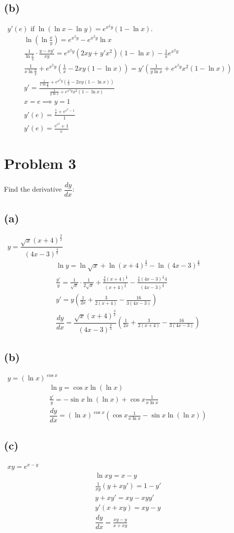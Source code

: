 \documentclass[12pt]{article}
\newcommand{\dydx}{\dfrac{dy}{dx}}
\newcommand{\vem}{\vspace{0.5em}}
\newcommand{\problem}[1]{\section{Problem #1}}
\newcommand{\subproblem}[1]{\subsection{(#1)} \,}
\begin{document}
\subproblem{b} $y'(e)$ if $\ln (\ln x-\ln y)=e^{x^2y}(1-\ln x)$.
\begin{gather*}
    \ln (\ln\frac{x}{y})=e^{x^2y}-e^{x^2y} \ln x\\
    \frac{1}{\ln \frac{x}{y}}\cdot \frac{y-xy'}{xy}=e^{x^2y}(2xy+y'x^2)(1-\ln x)-\frac{1}{x}e^{x^2y}\\
    \frac{1}{x \ln \frac{x}{y}}+e^{x^2y}(\frac{1}{x}-2xy(1-\ln x))=y'(\frac{1}{y \ln x}+e^{x^2y}x^2(1- \ln x))\\
    y'=\frac{\frac{1}{x \ln \frac{x}{y}}+e^{x^2y}(\frac{1}{x}-2xy(1-\ln x))}{\frac{1}{y \ln x}+e^{x^2y}x^2(1- \ln x)}\\
    x=e \implies y=1\\
    y'(e)=\frac{\frac{1}{e}+e^{e^2-1}}{1}\\
    \boxed{y'(e)=\frac{e^{e^2}+1}{e}}
\end{gather*}

\problem{3}
Find the derivative $\dydx$: \vem

\subproblem{a} $y=\dfrac{\sqrt{x}(x+4)^\frac{3}{2}}{(4x-3)^\frac{4}{3}}$
\begin{gather*}
    \ln y = \ln \sqrt{x} +\ln (x+4)^\frac{3}{2}-\ln (4x-3)^{\frac{4}{3}}\\
    \frac{y'}{y}= \frac{1}{\sqrt{x}}\cdot\frac{1}{2\sqrt{x}}+\frac{\frac{3}{2}(x+4)^\frac{1}{2}}{(x+4)^\frac{3}{2}}-\frac{\frac{4}{3}(4x-3)^\frac{1}{3}4}{(4x-3)^\frac{4}{3}}\\
    y'=y(\frac{1}{2x}+\frac{3}{2(x+4)}-\frac{16}{3(4x-3)})\\
    \boxed{\dydx=\dfrac{\sqrt{x}(x+4)^\frac{3}{2}}{(4x-3)^\frac{4}{3}}(\frac{1}{2x}+\frac{3}{2(x+4)}-\frac{16}{3(4x-3)})}
\end{gather*}

\subproblem{b} $y=(\ln x)^{\cos x}$
\begin{gather*}
    \ln y =\cos x \ln (\ln x)\\
    \frac{y'}{y}=-\sin x\ln (\ln x)+\cos x \frac{1}{x \ln x}\\
    \boxed{\dydx =(\ln x)^{\cos x}(\cos x \frac{1}{x \ln x}-\sin x\ln (\ln x))}
\end{gather*}

\subproblem{c} $xy=e^{x-y}$
\begin{gather*}
    \ln xy=x-y\\
    \frac{1}{xy}(y+xy')=1-y'\\
    y+xy'=xy-xyy'\\
    y'(x+xy)=xy-y\\
    \boxed{\dydx =\frac{xy-y}{x+xy}}
\end{gather*}
\end{document}
